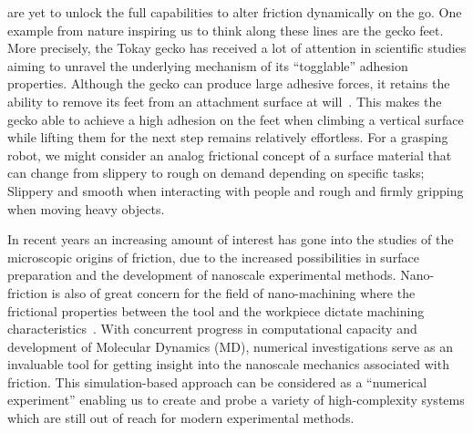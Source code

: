 are yet to unlock the full capabilities to alter friction dynamically on the go.
One example from nature inspiring us to think along these lines are the gecko
feet. More precisely, the Tokay gecko has received a lot of attention in
scientific studies aiming to unravel the underlying mechanism of its
``togglable'' adhesion properties. Although the gecko can produce large adhesive
forces, it retains the ability to remove its feet from an attachment surface
at will~\cite{Gekko}. This makes the gecko able to achieve a high adhesion on
the feet when climbing a vertical surface while lifting them for the next step
remains relatively effortless. For a grasping robot, we might consider an analog
frictional concept of a surface material that can change from slippery to rough
on demand depending on specific tasks; Slippery and smooth when interacting with
people and rough and firmly gripping when moving heavy objects.


In recent years an increasing amount of interest has gone into the studies of
the microscopic origins of friction, due to the increased possibilities in
surface preparation and the development of nanoscale experimental methods.
Nano-friction is also of great concern for the field of nano-machining where the
frictional properties between the tool and the workpiece dictate machining
characteristics~\cite{kim_nano-scale_2009}. With concurrent progress in
computational capacity and development of Molecular Dynamics (\acrshort{MD}),
numerical investigations serve as an invaluable tool for getting insight into
the nanoscale mechanics associated with friction. This simulation-based approach
can be considered as a ``numerical experiment'' enabling us to create and probe
a variety of high-complexity systems which are still out of reach for modern
experimental methods.

